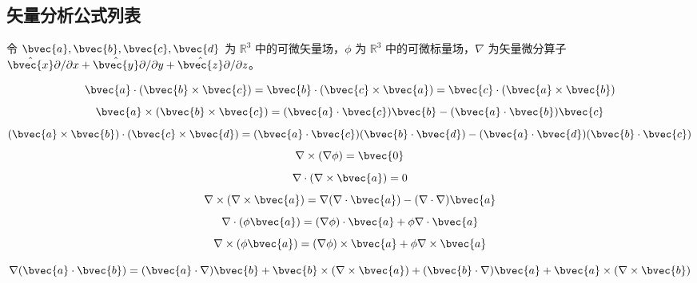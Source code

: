 
\begin{issues}
\end{issues}

\subsection{矢量分析公式列表}

令 $\bvec{a}, \bvec{b}, \bvec{c}, \bvec{d}$ 为 $\mathbb{R}^3$ 中的可微矢量场，$\phi$ 为 $\mathbb{R}^3$ 中的可微标量场，$\nabla$ 为矢量微分算子 $\hat{\bvec{x}}\partial/\partial{x}+\hat{\bvec{y}}\partial/\partial{y}+\hat{\bvec{z}}\partial/\partial{z}$。

\begin{equation}
\bvec{a}\cdot(\bvec{b}\times\bvec{c})=\bvec{b}\cdot(\bvec{c}\times\bvec{a})=\bvec{c}\cdot(\bvec{a}\times\bvec{b})
\end{equation}
\begin{equation}
\bvec{a}\times(\bvec{b}\times\bvec{c})=(\bvec{a}\cdot\bvec{c})\bvec{b}-(\bvec{a}\cdot\bvec{b})\bvec{c}
\end{equation}
\begin{equation}
(\bvec{a}\times\bvec{b})\cdot(\bvec{c}\times\bvec{d})=(\bvec{a}\cdot\bvec{c})(\bvec{b}\cdot\bvec{d})-(\bvec{a}\cdot\bvec{d})(\bvec{b}\cdot\bvec{c})
\end{equation}
\begin{equation}
\nabla\times(\nabla\phi)=\bvec{0}
\end{equation}
\begin{equation}
\nabla\cdot(\nabla\times\bvec{a})=0
\end{equation}
\begin{equation}
\nabla\times(\nabla\times\bvec{a})=\nabla(\nabla\cdot\bvec{a})-(\nabla\cdot\nabla)\bvec{a}
\end{equation}
\begin{equation}
\nabla\cdot(\phi\bvec{a})=(\nabla\phi)\cdot\bvec{a}+\phi\nabla\cdot\bvec{a}
\end{equation}
\begin{equation}
\nabla\times(\phi\bvec{a})=(\nabla\phi)\times\bvec{a}+\phi\nabla\times\bvec{a}
\end{equation}

\begin{equation}\label{VecAnl_eq15}
\nabla(\bvec{a}\cdot\bvec{b})=(\bvec{a}\cdot\nabla)\bvec{b}+\bvec{b}\times(\nabla\times\bvec{a})+(\bvec{b}\cdot\nabla)\bvec{a}+\bvec{a}\times(\nabla\times\bvec{b})
\end{equation}


